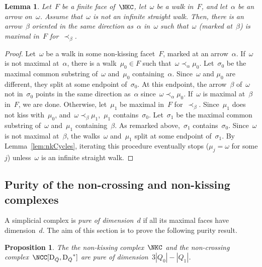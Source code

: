 \documentclass{amsart}
\newtheorem{proposition}[theorem]{Proposition}
\newtheorem{lemma}[theorem]{Lemma}
\theoremstyle{definition}
\newcommand{\darkblue}{\color{darkblue}} %
\newcommand{\defn}[1]{\textsl{\darkblue #1}} %
\newcommand{\dual}{^*} %
\newcommand{\dissection}{\mathrm{D}} %
\begin{document}
\begin{lemma}\label{lem:ExistenceOfDistinguishedArrows}
Let~$F$ be a finite face of~$\NKC$, let~$\omega$ be a walk in~$F$, and let~$\alpha$ be an arrow on~$\omega$.
Assume that~$\omega$ is not an infinite straight walk.
Then, there is an arrow~$\beta$ oriented in the same direction as~$\alpha$ in~$\omega$ such that~$\omega$ (marked at~$\beta$) is maximal in~$F$ for~$\prec_\beta$.
\end{lemma}

\begin{proof}
Let~$\omega$ be a walk in some non-kissing facet~$F$, marked at an arrow~$\alpha$.
If~$\omega$ is not maximal at~$\alpha$, there is a walk~$\mu_0\in F$ such that~$\omega\prec_\alpha \mu_0$.
Let~$\sigma_0$ be the maximal common substring of~$\omega$ and~$\mu_0$ containing~$\alpha$.
Since~$\omega$ and $\mu_0$ are different, they split at some endpoint of~$\sigma_0$.
At this endpoint, the arrow~$\beta$ of~$\omega$ not in~$\sigma_0$ points in the same direction as~$\alpha$ since~$\omega \prec_\alpha \mu_0$.
If~$\omega$ is maximal at~$\beta$ in~$F$, we are done.
Otherwise, let~$\mu_1$ be maximal in~$F$ for~$\prec_\beta$.
Since~$\mu_1$ does not kiss with~$\mu_0$, and~$\omega\prec_\beta\mu_1$,~$\mu_1$ contains~$\sigma_0$.
Let~$\sigma_1$ be the maximal common substring of~$\omega$ and~$\mu_1$ containing~$\beta$.
As remarked above,~$\sigma_1$ contains~$\sigma_0$.
Since~$\omega$ is not maximal at~$\beta$, the walks~$\omega$ and~$\mu_1$ split at some endpoint of~$\sigma_1$.
By Lemma~\ref{lem:nkCycles}, iterating this procedure eventually stops ($\mu_j=\omega$ for some $j$) unless~$\omega$ is an infinite straight walk.
\end{proof}



\subsection{Purity of the non-crossing and non-kissing complexes}

A simplicial complex is \defn{pure of dimension~$d$} if all its maximal faces have dimension~$d$.
The aim of this section is to prove the following purity result.

\begin{proposition}
\label{prop:purity}
 The the non-kissing complex~$\NKC$ and the non-crossing complex~$\NCC[\dissection_{\bar Q}, {\dissection_{\bar Q}}\dual]$ are pure of dimension~$3|Q_0| - |Q_1|$.
\end{proposition}
\end{document}
